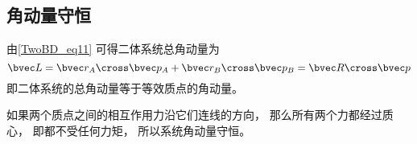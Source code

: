 \subsection{角动量守恒}

由\autoref{TwoBD_eq11} 可得二体系统总角动量为
\begin{equation}
\bvec L = \bvec r_A \cross \bvec p_A + \bvec r_B \cross \bvec p_B
= \bvec R \cross \bvec p
\end{equation}
即二体系统的总角动量等于等效质点的角动量。

如果两个质点之间的相互作用力沿它们连线的方向， 那么所有两个力都经过质心， 即都不受任何力矩， 所以系统角动量守恒。
